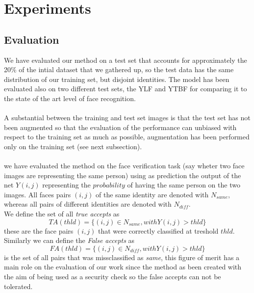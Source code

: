 \section{Experiments}

\subsection{Evaluation}
We have evaluated our method on a test set that accounts for approximately the 20\% of the intial dataset that we gathered up, so the test data has the same distribution of our training set, but disjoint identities.
The model has been evaluated also on two different test sets, the YLF and YTBF for comparing it to the state of the art level of face recognition. 
\paragraph{}
A substantial between the training and test set images is that the test set has not been augmented so that the evaluation of the performance can unbiased with respect to the training set as much as possible, augmentation has been performed only on the training set (see next subsection).
\paragraph{}
we have evaluated the method on the face verification task (say wheter two face images are representing the same person) using as prediction the output of the net $Y(i,j)$ representing the $probability$ of having the same person on the two images. All faces pairs $(i,j)$ of the same identity are denoted with $N_{same}$, whereas all pairs of different identities are denoted with $N_{diff}$.\\
 
We define the set of all \textit{true accepts} as
\begin{equation}
TA(thld)=\{(i,j) \in N_{same}, with Y(i,j) > thld\}
\end{equation}
these are the face pairs $(i,j)$ that were correctly classified at treshold $thld$.
Similarly we can define the \textit{False accepts} as 
\begin{equation}
FA(thld)=\{(i,j) \in N_{diff}, with Y(i,j) > thld\} 
\end{equation}
is the set of all pairs that was missclassified as \textit{same}, this figure of merit has a main role on the evaluation of our work since the method as been created with the aim of being used as a security check so the false accepts can not be tolerated.
